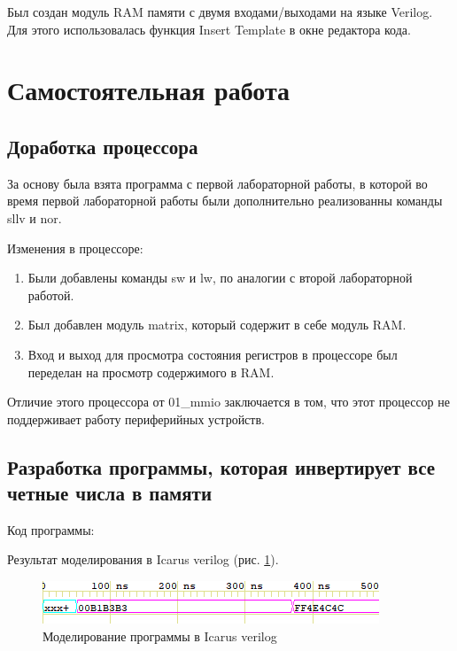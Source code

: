 \documentclass[a4paper,14pt]{article}
\begin{document}
	Был создан модуль RAM памяти с двумя входами/выходами на языке Verilog.
	Для этого использовалась функция Insert Template в окне редактора кода.
	
	\section{Самостоятельная работа}
	
	
	\subsection{Доработка процессора}
	
	
	За основу была взята программа с первой лабораторной работы, в которой во время первой лабораторной работы были дополнительно реализованны команды sllv и nor.
	
	Изменения в процессоре:
	
	\begin{enumerate}
		\item Были добавлены команды sw и lw, по аналогии с второй лабораторной работой.
		
		\item Был добавлен модуль matrix, который содержит в себе модуль RAM.
		
		\item Вход и выход для просмотра состояния регистров в процессоре был переделан на просмотр содержимого в RAM.
	\end{enumerate}
	
	Отличие этого процессора от 01\_mmio заключается в том, что этот процессор не поддерживает работу периферийных устройств.
	
	\subsection{Разработка программы, которая инвертирует все четные числа в памяти}
	
	Код программы:
	
	{\small {}}
	
	Результат моделирования в Icarus verilog (рис. \ref{fig:wvf16}).
	
	\begin{figure}[H]
		\centering
		\includegraphics[width=0.7\linewidth]{images/wvf_16}
		\caption{Моделирование программы в Icarus verilog}
		\label{fig:wvf16}
	\end{figure}	
\end{document}
